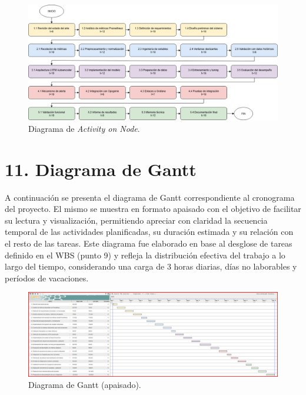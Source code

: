 \documentclass[
11pt, %
]{charter}
\begin{document}
\begin{figure}[htpb]
\centering 
\includegraphics[width=1\textwidth]{./Figuras/AoN.png}
\caption{Diagrama de \textit{Activity on Node}.}
\label{fig:AoN}
\end{figure}



\section{11. Diagrama de Gantt}
\label{sec:gantt}
A continuación se presenta el diagrama de Gantt correspondiente al cronograma del proyecto. El mismo se muestra en formato apaisado con el objetivo de facilitar su lectura y visualización, permitiendo apreciar con claridad la secuencia temporal de las actividades planificadas, su duración estimada y su relación con el resto de las tareas. Este diagrama fue elaborado en base al desglose de tareas definido en el WBS (punto 9) y refleja la distribución efectiva del trabajo a lo largo del tiempo, considerando una carga de 3 horas diarias, días no laborables y períodos de vacaciones. 
\begin{landscape}
\begin{figure}[H]
\centering
\includegraphics[width=\linewidth,keepaspectratio]{./Figuras/Gantt-2.png}
\caption{Diagrama de Gantt (apaisado).}
\label{fig:diagGantt}

\end{figure}
\end{landscape}
\end{document}
